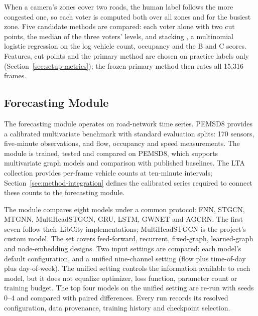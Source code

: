 When a camera's zones cover two roads, the human label follows the more
congested one, so each voter is computed both over all zones and for the busiest
zone. Five candidate methods are compared: each voter alone with two cut points,
the median of the three voters' levels, and stacking
\parencite{wolpert1992stacking}, a multinomial logistic regression on the log
vehicle count, occupancy and the B and C scores. Features, cut points and the
primary method are chosen on practice labels only
(Section~\ref{sec:setup-metrics}); the frozen primary method then rates all
15,316 frames.

\subsection{Forecasting Module}\label{sec:method-forecasting}

The forecasting module operates on road-network time series. PEMSD8 provides a
calibrated multivariate benchmark with standard evaluation splits: 170 sensors,
five-minute observations, and flow, occupancy and speed measurements. The module
is trained, tested and compared on PEMSD8, which supports multivariate graph
models and comparison with published baselines. The LTA collection provides
per-frame vehicle counts at ten-minute intervals; Section~\ref{sec:method-integration}
defines the calibrated series required to connect these counts to the
forecasting module.

The module compares eight models under a common protocol: FNN, STGCN, MTGNN,
MultiHeadSTGCN, GRU, LSTM, GWNET and AGCRN. The first seven follow their LibCity
implementations; MultiHeadSTGCN is the project's custom model. The set covers
feed-forward, recurrent, fixed-graph, learned-graph and node-embedding designs.
Two input settings are compared: each model's default configuration, and a
unified nine-channel setting (flow plus time-of-day plus day-of-week). The
unified setting controls the information available to each model, but it does
not equalize optimizer, loss function, parameter count or training budget. The
top four models on the unified setting are re-run with seeds 0--4 and compared
with paired differences. Every run records its resolved configuration, data
provenance, training history and checkpoint selection.

